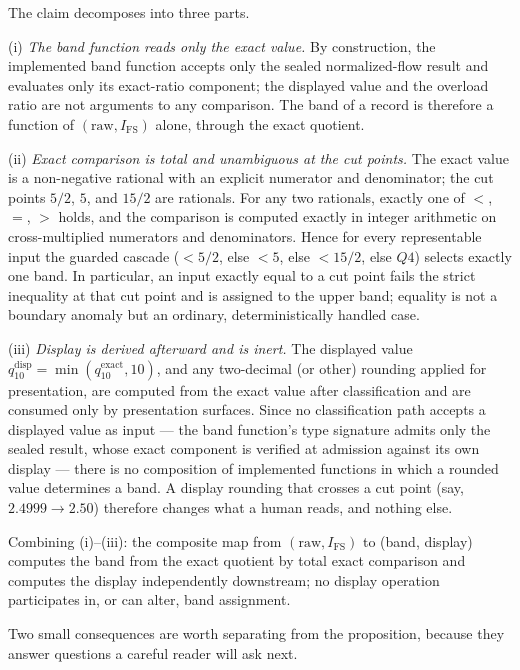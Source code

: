\begin{designargument}
The claim decomposes into three parts.

(i) \emph{The band function reads only the exact value.} By construction,
the implemented band function accepts only the sealed normalized-flow
result and evaluates only its exact-ratio component; the displayed value
and the overload ratio are not arguments to any comparison. The band of a
record is therefore a function of
$(\mathrm{raw}, I_{\mathrm{FS}})$ alone, through the exact quotient.

(ii) \emph{Exact comparison is total and unambiguous at the cut points.}
The exact value is a non-negative rational with an explicit numerator and
denominator; the cut points $5/2$, $5$, and $15/2$ are rationals. For any
two rationals, exactly one of $<$, $=$, $>$ holds, and the comparison is
computed exactly in integer arithmetic on cross-multiplied numerators and
denominators. Hence for every representable input the guarded cascade
($< 5/2$, else $< 5$, else $< 15/2$, else $Q4$) selects exactly one band.
In particular, an input exactly equal to a cut point fails the strict
inequality at that cut point and is assigned to the upper band; equality is
not a boundary anomaly but an ordinary, deterministically handled case.

(iii) \emph{Display is derived afterward and is inert.} The displayed value
$q_{10}^{\mathrm{disp}} = \min(q_{10}^{\mathrm{exact}}, 10)$, and any
two-decimal (or other) rounding applied for presentation, are computed from
the exact value after classification and are consumed only by presentation
surfaces. Since no classification path accepts a displayed value as input
--- the band function's type signature admits only the sealed result, whose
exact component is verified at admission against its own display --- there
is no composition of implemented functions in which a rounded value
determines a band. A display rounding that crosses a cut point (say,
$2.4999 \rightarrow 2.50$) therefore changes what a human reads, and
nothing else.

Combining (i)--(iii): the composite map from $(\mathrm{raw},
I_{\mathrm{FS}})$ to (band, display) computes the band from the exact
quotient by total exact comparison and computes the display independently
downstream; no display operation participates in, or can alter, band
assignment.
\end{designargument}

Two small consequences are worth separating from the proposition,
because they answer questions a careful reader will ask next.

